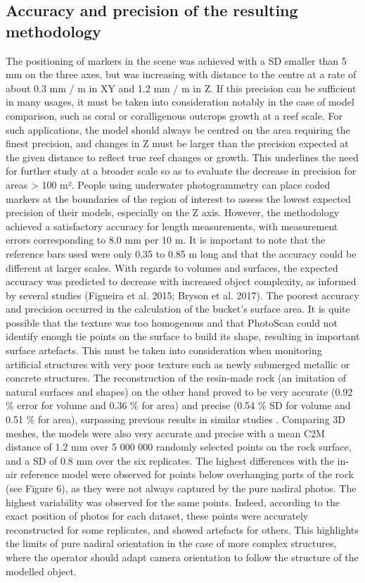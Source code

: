 \subsection{Accuracy and precision of the resulting methodology}\label{chapitre1_4.2}
The positioning of markers in the scene was achieved with a SD smaller than 5 mm on the three axes, but was increasing with distance to the centre at a rate of about 0.3 mm / m in XY and 1.2 mm / m in Z. If this precision can be sufficient in many usages, it must be taken into consideration notably in the case of model comparison, such as coral or coralligenous outcrops growth at a reef scale. For such applications, the model should always be centred on the area requiring the finest precision, and changes in Z must be larger than the precision expected at the given distance to reflect true reef changes or growth. This underlines the need for further study at a broader scale so as to evaluate the decrease in precision for areas > 100 m². People using underwater photogrammetry can place coded markers at the boundaries of the region of interest to assess the lowest expected precision of their models, especially on the Z axis.
\medskip
However, the methodology achieved a satisfactory accuracy for length measurements, with measurement errors corresponding to 8.0 mm per 10 m. It is important to note that the reference bars used were only 0.35 to 0.85 m long and that the accuracy could be different at larger scales. With regards to volumes and surfaces, the expected accuracy was predicted to decrease with increased object complexity, as informed by several studies (Figueira et al. 2015; Bryson et al. 2017). The poorest accuracy and precision occurred in the calculation of the bucket’s surface area. It is quite possible that the texture was too homogenous and that PhotoScan could not identify enough tie points on the surface to build its shape, resulting in important surface artefacts. This must be taken into consideration when monitoring artificial structures with very poor texture such as newly submerged metallic or concrete structures. The reconstruction of the resin-made rock (an imitation of natural surfaces and shapes) on the other hand proved to be very accurate (0.92 \% error for volume and 0.36 \% for area) and precise (0.54 \% SD for volume and 0.51 \% for area), surpassing previous results in similar studies \citep{figueira_accuracy_2015, bythell_three-dimensional_2001, courtney_estimating_2007, gutierrez-heredia_end_2016, lavy_quick_2015, shortis_calibration_2015}. Comparing 3D meshes, the models were also very accurate and precise with a mean C2M distance of 1.2 mm over 5 000 000 randomly selected points on the rock surface, and a SD of 0.8 mm over the six replicates. The highest differences with the in-air reference model were observed for points below overhanging parts of the rock (see Figure 6), as they were not always captured by the pure nadiral photos. The highest variability was observed for the same points. Indeed, according to the exact position of photos for each dataset, these points were accurately reconstructed for some replicates, and showed artefacts for others. This highlights the limits of pure nadiral orientation in the case of more complex structures, where the operator should adapt camera orientation to follow the structure of the modelled object.
